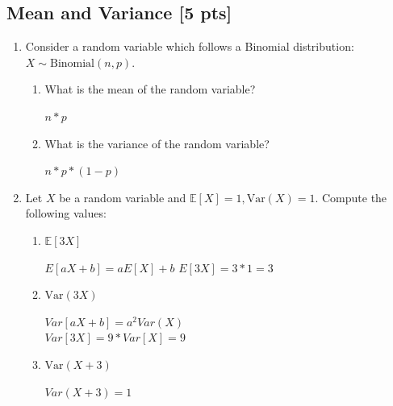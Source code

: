 \documentclass[a4paper]{article}
\theoremstyle{definition}
\newcommand{\Var}{\mathrm{Var}}
\newenvironment{soln}{
    \leavevmode\color{blue}\ignorespaces
}{}
\begin{document}
\subsection{Mean and Variance [5 pts]}
\begin{enumerate}
\item Consider a random variable which follows a Binomial
  distribution: $X \sim \text{Binomial}(n, p)$.
  \begin{enumerate}
  \item What is the mean of the random variable?\\
    \begin{soln}  
	$n*p$
   \end{soln}

  \item What is the variance of the random variable?\\
    \begin{soln}  
	$n * p * (1 - p)$
   \end{soln}
  \end{enumerate}

\item Let $X$ be a random variable and
  $\mathbb{E}[X] = 1, \Var(X) = 1$. Compute the following values:
  \begin{enumerate}
  \item $\mathbb{E}[3X]$\\
    \begin{soln}  
	$E[aX + b] = aE[X] + b$
	$E[3X] = 3*1 = 3$
 \end{soln}
  \item $\Var(3X)$\\
    \begin{soln}  
	$Var[aX + b] = a^{2}Var(X)$
        \\$Var[3X] = 9*Var[X] = 9$
\end{soln}
  \item $\Var(X+3)$\\
    \begin{soln}  
	$Var(X+3) = 1$
 \end{soln}
  \end{enumerate}
\end{enumerate}

\end{document}
